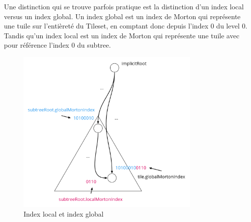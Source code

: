 Une distinction qui se trouve parfois pratique est la distinction d'un index local versus un index global. Un index global est un index de Morton qui représente une tuile sur l'entièreté du Tileset, en comptant donc depuis l'index 0 du level 0. Tandis qu'un index local est un index de Morton qui représente une tuile avec pour référence l'index 0 du subtree.

\begin{figure}[H]
    \centering
    \includegraphics[width=0.8\textwidth]{assets/figures/global-to-local-morton.png}
    \caption{Index local et index global \cite{availability-gh}}
    \label{fig:xy-morton}
\end{figure}